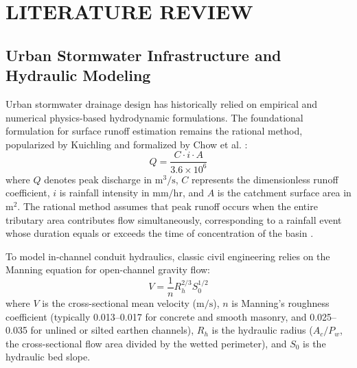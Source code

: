 \chapter{LITERATURE REVIEW}

\section{Urban Stormwater Infrastructure and Hydraulic Modeling}
Urban stormwater drainage design has historically relied on empirical and numerical physics-based hydrodynamic formulations. The foundational formulation for surface runoff estimation remains the rational method, popularized by Kuichling and formalized by Chow et al. \cite{chow1988applied}:
\begin{equation}
Q = \frac{C \cdot i \cdot A}{3.6 \times 10^6}
\label{eqn:rational_foundational}
\end{equation}
where $Q$ denotes peak discharge in $\text{m}^3/\text{s}$, $C$ represents the dimensionless runoff coefficient, $i$ is rainfall intensity in $\text{mm}/\text{hr}$, and $A$ is the catchment surface area in $\text{m}^2$. The rational method assumes that peak runoff occurs when the entire tributary area contributes flow simultaneously, corresponding to a rainfall event whose duration equals or exceeds the time of concentration of the basin \cite{butler2018urban}.

To model in-channel conduit hydraulics, classic civil engineering relies on the Manning equation for open-channel gravity flow:
\begin{equation}
V = \frac{1}{n} R_h^{2/3} S_0^{1/2}
\label{eqn:manning_formula}
\end{equation}
where $V$ is the cross-sectional mean velocity ($\text{m}/\text{s}$), $n$ is Manning's roughness coefficient (typically 0.013--0.017 for concrete and smooth masonry, and 0.025--0.035 for unlined or silted earthen channels), $R_h$ is the hydraulic radius ($A_c / P_w$, the cross-sectional flow area divided by the wetted perimeter), and $S_0$ is the hydraulic bed slope.

